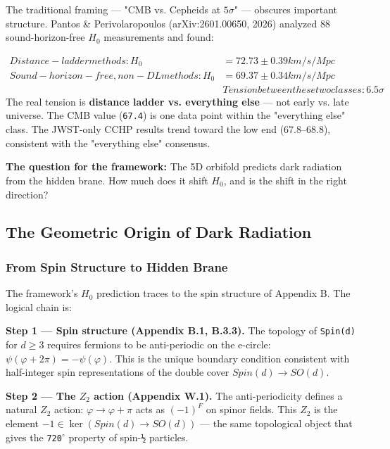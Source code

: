 \documentclass[aps,prd,preprint,superscriptaddress,longbibliography,floatfix]{revtex4-2}
\theoremstyle{remark}
\begin{document}
The traditional framing --- "CMB vs. Cepheids at $5\sigma$" --- obscures important structure. Pantos \& Perivolaropoulos (arXiv:2601.00650, 2026) analyzed 88 sound-horizon-free $H_{0}$ measurements and found:


\begin{align}
    Distance-ladder methods:              H_{0} &= 72.73 \pm 0.39 km/s/Mpc \\
    Sound-horizon-free, non-DL methods:  H_{0} &= 69.37 \pm 0.34 km/s/Mpc \\
    & Tension between these two classes:   6.5\sigma
\end{align}
The real tension is \textbf{distance ladder vs. everything else} --- not early vs. late universe. The CMB value (\texttt{67.4}) is one data point within the "everything else" class. The JWST-only CCHP results trend toward the low end (67.8--68.8), consistent with the "everything else" consensus.

\textbf{The question for the framework:} The 5D orbifold predicts dark radiation from the hidden brane. How much does it shift $H_{0}$, and is the shift in the right direction?



\subsection{The Geometric Origin of Dark Radiation}


\subsubsection{From Spin Structure to Hidden Brane}

The framework's $H_{0}$ prediction traces to the spin structure of Appendix B. The logical chain is:

\textbf{Step 1 --- Spin structure (Appendix B.1, B.3.3).} The topology of \texttt{Spin(d)} for $d \geq 3$ requires fermions to be anti-periodic on the e-circle: $\psi(\varphi + 2\pi) = -\psi(\varphi)$. This is the unique boundary condition consistent with half-integer spin representations of the double cover $Spin(d) \to SO(d)$.

\textbf{Step 2 --- The $Z_{2}$ action (Appendix W.1).} The anti-periodicity defines a natural $Z_{2}$ action: $\varphi \to \varphi + \pi$ acts as $(-1)^F$ on spinor fields. This $Z_{2}$ is the element $-1 \in \ker(Spin(d) \to SO(d))$ --- the same topological object that gives the \texttt{720$^{\circ}$} property of spin-\texttt{½} particles.
\end{document}
